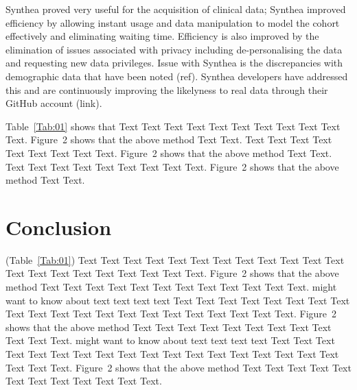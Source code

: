 \documentclass{bioinfo}
\begin{document}
Synthea proved very useful for the acquisition of clinical data; Synthea improved efficiency by allowing instant usage and data manipulation to model the cohort effectively and eliminating waiting time. Efficiency is also improved by the elimination of issues associated with privacy including de-personalising the data and requesting new data privileges. 
Issue with Synthea is the discrepancies with demographic data that have been noted (ref). Synthea developers have addressed this and are continuously improving the likelyness to real data through their GitHub account (link). 


Table~\ref{Tab:01} shows that Text Text Text Text Text  Text Text
Text Text Text Text. Figure~2\vphantom{\ref{fig:02}} shows that
the above method Text Text. Text Text Text  Text Text Text Text
Text Text. Figure~2\vphantom{\ref{fig:02}} shows that the above
method Text Text. Text Text Text  Text Text Text Text Text Text.
Figure~2\vphantom{\ref{fig:02}} shows that the above method Text
Text.









%
%






\section{Conclusion}

(Table~\ref{Tab:01}) Text Text Text Text Text Text  Text Text Text
Text Text Text Text Text Text  Text Text Text Text Text Text.
Figure~2\vphantom{\ref{fig:02}} shows that the above method  Text
Text Text Text  Text Text Text Text Text Text  Text Text.
\citealp{Boffelli03} might want to know about  text text text text
Text Text Text Text Text Text  Text Text Text Text Text Text Text
Text Text  Text Text Text Text Text Text.
Figure~2\vphantom{\ref{fig:02}} shows that the above method  Text
Text Text Text  Text Text Text Text Text Text  Text Text.
\citealp{Boffelli03} might want to know about  text text text text
Text Text Text Text Text Text Text Text Text Text Text Text Text
Text Text  Text Text Text Text Text Text.
Figure~2\vphantom{\ref{fig:02}} shows that the above method  Text
Text Text Text  Text Text Text Text Text Text  Text Text.
\end{document}
